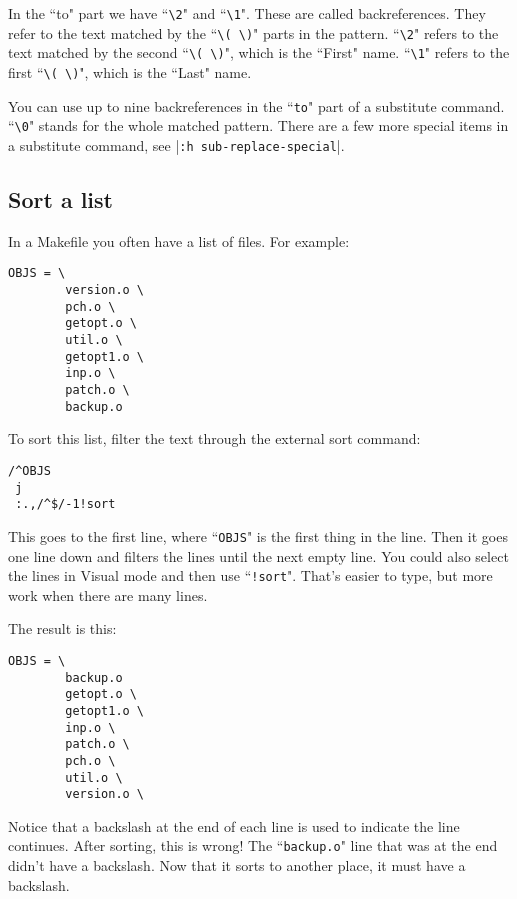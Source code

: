 In the ``to" part we have ``\texttt{\textbackslash{}2}" and ``\texttt{\textbackslash{}1}".
These are called backreferences.
They refer to the text matched by the ``\texttt{\textbackslash{}( \textbackslash{})}" parts in the pattern.
``\texttt{\textbackslash{}2}" refers to the text matched by the second ``\texttt{\textbackslash{}( \textbackslash{})}", which is the ``First" name.
``\texttt{\textbackslash{}1}" refers to the first ``\texttt{\textbackslash{}( \textbackslash{})}", which is the ``Last" name.

You can use up to nine backreferences in the ``\texttt{to}" part of a substitute command.
``\texttt{\textbackslash{}0}" stands for the whole matched pattern.
There are a few more special items in a substitute command, see |\texttt{:h sub-replace-special}|.
\subsection{Sort a list}

In a Makefile you often have a list of files.
For example:

\begin{Verbatim}[samepage=true]
    OBJS = \
        version.o \
        pch.o \
        getopt.o \
        util.o \
        getopt1.o \
        inp.o \
        patch.o \
        backup.o
\end{Verbatim}

To sort this list, filter the text through the external sort command:

\begin{Verbatim}[samepage=true]
 /^OBJS
 j
 :.,/^$/-1!sort
\end{Verbatim}

This goes to the first line, where ``\texttt{OBJS}" is the first thing in the line.
Then it goes one line down and filters the lines until the next empty line.
You could also select the lines in Visual mode and then use ``\texttt{!sort}".
That's easier to type, but more work when there are many lines.

The result is this:

\begin{Verbatim}[samepage=true]
    OBJS = \
        backup.o
        getopt.o \
        getopt1.o \
        inp.o \
        patch.o \
        pch.o \
        util.o \
        version.o \
\end{Verbatim}

Notice that a backslash at the end of each line is used to indicate the line continues.
After sorting, this is wrong!
The ``\texttt{backup.o}" line that was at the end didn't have a backslash.
Now that it sorts to another place, it must have a backslash.

